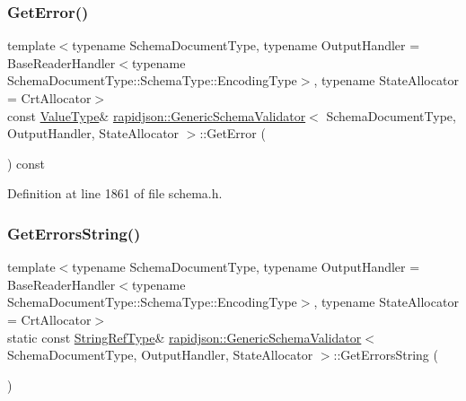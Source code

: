 \subsubsection{\texorpdfstring{GetError()}{GetError()}\hspace{0.1cm}{\footnotesize\ttfamily [2/2]}}
{\footnotesize\ttfamily template$<$typename Schema\+Document\+Type, typename Output\+Handler = Base\+Reader\+Handler$<$typename Schema\+Document\+Type\+::\+Schema\+Type\+::\+Encoding\+Type$>$, typename State\+Allocator = Crt\+Allocator$>$ \\
const \mbox{\hyperlink{classrapidjson_1_1_generic_schema_validator_a14216aea798d69f102987c1aae36e897}{Value\+Type}}\& \mbox{\hyperlink{classrapidjson_1_1_generic_schema_validator}{rapidjson\+::\+Generic\+Schema\+Validator}}$<$ Schema\+Document\+Type, Output\+Handler, State\+Allocator $>$\+::Get\+Error (\begin{DoxyParamCaption}{ }\end{DoxyParamCaption}) const}



Definition at line 1861 of file schema.\+h.


\begin{DoxyCode}{0}

\end{DoxyCode}
\mbox{\label{classrapidjson_1_1_generic_schema_validator_a4712e21be1d1fe2b652eb297454fc661}} 
\subsubsection{\texorpdfstring{GetErrorsString()}{GetErrorsString()}}
{\footnotesize\ttfamily template$<$typename Schema\+Document\+Type, typename Output\+Handler = Base\+Reader\+Handler$<$typename Schema\+Document\+Type\+::\+Schema\+Type\+::\+Encoding\+Type$>$, typename State\+Allocator = Crt\+Allocator$>$ \\
static const \mbox{\hyperlink{classrapidjson_1_1_generic_schema_validator_af6d33bab73e771af8c06f2b05e878350}{String\+Ref\+Type}}\& \mbox{\hyperlink{classrapidjson_1_1_generic_schema_validator}{rapidjson\+::\+Generic\+Schema\+Validator}}$<$ Schema\+Document\+Type, Output\+Handler, State\+Allocator $>$\+::Get\+Errors\+String (\begin{DoxyParamCaption}{ }\end{DoxyParamCaption})\hspace{0.3cm}{\ttfamily [static]}}



